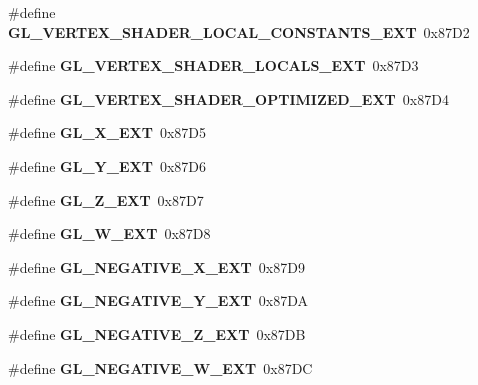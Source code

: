 \begin{DoxyCompactItemize}
\item 
\#define {\bfseries G\+L\+\_\+\+V\+E\+R\+T\+E\+X\+\_\+\+S\+H\+A\+D\+E\+R\+\_\+\+L\+O\+C\+A\+L\+\_\+\+C\+O\+N\+S\+T\+A\+N\+T\+S\+\_\+\+E\+X\+T}~0x87\+D2\label{_s_d_l__opengl_8h_a09186e17c212551bf18ee0f8e1501425}

\item 
\#define {\bfseries G\+L\+\_\+\+V\+E\+R\+T\+E\+X\+\_\+\+S\+H\+A\+D\+E\+R\+\_\+\+L\+O\+C\+A\+L\+S\+\_\+\+E\+X\+T}~0x87\+D3\label{_s_d_l__opengl_8h_a73a235b24cfd1a73aa70ebc32564c116}

\item 
\#define {\bfseries G\+L\+\_\+\+V\+E\+R\+T\+E\+X\+\_\+\+S\+H\+A\+D\+E\+R\+\_\+\+O\+P\+T\+I\+M\+I\+Z\+E\+D\+\_\+\+E\+X\+T}~0x87\+D4\label{_s_d_l__opengl_8h_a05a2fc9a7bbd0c719c484b9c626f339d}

\item 
\#define {\bfseries G\+L\+\_\+\+X\+\_\+\+E\+X\+T}~0x87\+D5\label{_s_d_l__opengl_8h_a1232c40bf70affc84247b16674e4d614}

\item 
\#define {\bfseries G\+L\+\_\+\+Y\+\_\+\+E\+X\+T}~0x87\+D6\label{_s_d_l__opengl_8h_a7ac1af55b77c0b6a58dcac585dabcf9e}

\item 
\#define {\bfseries G\+L\+\_\+\+Z\+\_\+\+E\+X\+T}~0x87\+D7\label{_s_d_l__opengl_8h_a711f6d3cab8ca90215d2b047f70f11f2}

\item 
\#define {\bfseries G\+L\+\_\+\+W\+\_\+\+E\+X\+T}~0x87\+D8\label{_s_d_l__opengl_8h_afcc172282476a03c027d70f559bbad13}

\item 
\#define {\bfseries G\+L\+\_\+\+N\+E\+G\+A\+T\+I\+V\+E\+\_\+\+X\+\_\+\+E\+X\+T}~0x87\+D9\label{_s_d_l__opengl_8h_a0680318a5ad06e98e6631ec0fef01144}

\item 
\#define {\bfseries G\+L\+\_\+\+N\+E\+G\+A\+T\+I\+V\+E\+\_\+\+Y\+\_\+\+E\+X\+T}~0x87\+D\+A\label{_s_d_l__opengl_8h_a0df77eca4c4d9169b70e1002e5493db1}

\item 
\#define {\bfseries G\+L\+\_\+\+N\+E\+G\+A\+T\+I\+V\+E\+\_\+\+Z\+\_\+\+E\+X\+T}~0x87\+D\+B\label{_s_d_l__opengl_8h_a7e9f4906c829b46161f9d2f4a4afa457}

\item 
\#define {\bfseries G\+L\+\_\+\+N\+E\+G\+A\+T\+I\+V\+E\+\_\+\+W\+\_\+\+E\+X\+T}~0x87\+D\+C\label{_s_d_l__opengl_8h_a0013018c97b1bd134aa95db8699366c0}


\end{DoxyCompactItemize}
